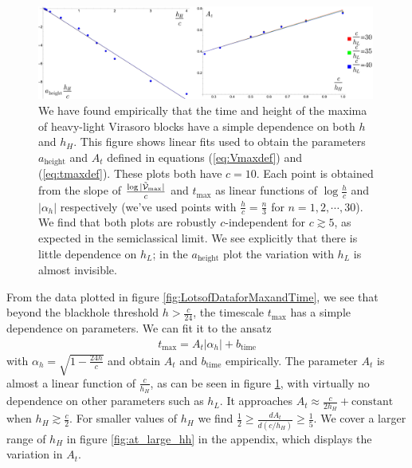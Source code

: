 \documentclass[12pt]{article}
\numberwithin{equation}{section}
\newcommand{\be}{\begin{eqnarray}}
\newcommand{\ee}{\end{eqnarray}}
\newcommand{\CV}{{\cal V}}
\begin{document}
\begin{figure}[h]
\begin{centering}
\includegraphics[width=0.99\textwidth]{aparameterfits}
	\caption{ We have found empirically that the time and height of the maxima of heavy-light Virasoro blocks have a simple dependence on both $h$ and $h_H$.  This figure shows linear fits used to obtain the parameters $a_{\text{height}}$ and $A_t$ defined in equations (\ref{eq:Vmaxdef}) and (\ref{eq:tmaxdef}).  These plots both have $c=10$. Each point is obtained from the slope of $\frac{\log|\tilde{\CV}_\text{max}|}{c}$ and $t_{\max}$ as linear functions of $\log \frac{h}{c}$ and $|\alpha_h|$ respectively (we've used points with $\frac{h}{c} = \frac{n}{3}$ for $n = 1, 2, \cdots, 30$).  We find that both plots are robustly $c$-independent for $c \gtrsim 5$, as expected in the semiclassical limit.  We see explicitly that there is little dependence on $h_L$; in the $a_{\text{height}}$ plot the variation with $h_L$ is almost invisible. }
\label{fig:aparameterfits}
\end{centering}
\end{figure}


From the data plotted in figure \ref{fig:LotsofDataforMaxandTime}, we see that beyond the blackhole threshold $h > \frac{c}{24}$, the timescale $t_{\text{max}}$ has a simple dependence on parameters.  We can fit it to the ansatz 
\be \label{eq:tmaxdef}
t_{\text{max}} = A_t  |\alpha_h| + b_{\text{time}}
\ee
with $\alpha_h=\sqrt{1-\frac{24h}{c}}$ and obtain $A_t$ and $b_{\text{time}}$ empirically.  The parameter $A_t$ is almost a linear function of $\frac{c}{h_H}$, as can be seen in figure \ref{fig:aparameterfits}, with virtually no dependence on other parameters such as $h_L$. It approaches $A_t \approx \frac{c}{2h_H}+\text{constant}$ when $h_H \gtrsim \frac{c}{2}$.  For smaller values of $h_H$ we find  $\frac{1}{2} \geq \frac{d A_t}{d(c/h_H)} \geq \frac{1}{5}$.    We cover a larger range of $h_H$ in figure \ref{fig:at_large_hh} in the appendix, which displays the variation in $A_t$.
\end{document}
